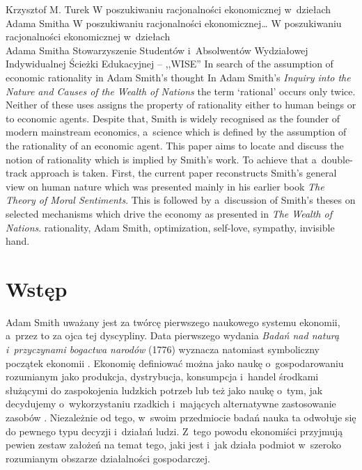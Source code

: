 \begin{artplenv}{Krzysztof M. Turek}
	{W poszukiwaniu racjonalności ekonomicznej w~dziełach Adama Smitha}
	{W poszukiwaniu racjonalności ekonomicznej\ldots}
	{W poszukiwaniu racjonalności ekonomicznej w~dziełach\\Adama Smitha}
	{Stowarzyszenie Studentów i~Absolwentów Wydziałowej Indywidualnej Ścieżki Edukacyjnej -- ,,WISE''\label{turek-start}}
	{In search of the assumption of economic rationality in Adam Smith’s thought}
	{In Adam Smith's \textit{Inquiry into the Nature and Causes of the Wealth of Nations} the term `rational' occurs only twice. Neither of these uses assigns the property of rationality either to human beings or to economic agents. Despite that, Smith is widely recognised as the founder of modern mainstream economics, a~science which is defined by the assumption of the rationality of an economic agent. This paper aims to locate and discuss the notion of rationality which is implied by Smith's work. To achieve that a~double-track approach is taken. First, the current paper reconstructs Smith's general view on human nature which was presented mainly in his earlier book \textit{The Theory of Moral Sentiments}. This is followed by a~discussion of Smith's theses on selected mechanisms which drive the economy as presented in \textit{The Wealth of Nations}.}
	{rationality, Adam Smith, optimization, self-love, sympathy, invisible hand.}
	


\section*{Wstęp}

Adam Smith uważany jest za twórcę pierwszego naukowego systemu ekonomii, a~przez to za ojca tej dyscypliny. Data
pierwszego wydania \textit{Badań nad naturą i~przyczynami bogactwa narodów} (1776) wyznacza natomiast symboliczny
początek ekonomii
\parencite[s.~25]{samuelson_ekonomia_2000}.
Ekonomię definiować można jako
naukę o~gospodarowaniu
\parencite[s.~17]{milewski_elementarne_2003}
rozumianym jako produkcja, dystrybucja,
konsumpcja i~handel środkami służącymi do zaspokojenia ludzkich potrzeb lub też jako naukę o~tym, jak decydujemy o~wykorzystaniu
rzadkich i~mających alternatywne zastosowanie zasobów
\parencite{black_slownik_2008,samuelson_ekonomia_2000}.
Niezależnie od tego, w~swoim przedmiocie badań nauka ta odwołuje się do pewnego typu decyzji i~działań
ludzi. Z~tego powodu ekonomiści przyjmują pewien zestaw założeń na temat tego, jaki jest i~jak działa podmiot w~szeroko
rozumianym obszarze działalności gospodarczej.


\end{artplenv}
